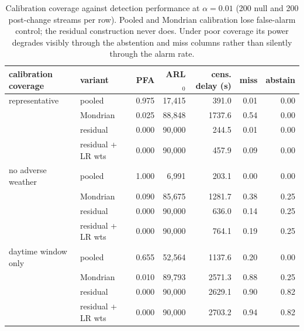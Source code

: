 \begin{table}[t]
\centering
\caption{Calibration coverage against detection performance at $\alpha=0.01$ (200 null and 200 post-change streams per row). Pooled and Mondrian calibration lose false-alarm control; the residual construction never does. Under poor coverage its power degrades visibly through the abstention and miss columns rather than silently through the alarm rate.}
\label{tab:coverage}
\begin{tabular}{llrrrrr}
\toprule
calibration coverage & variant & PFA & ARL$_0$ & cens. delay (s) & miss & abstain \\
\midrule
representative & pooled & 0.975 & 17,415 & 391.0 & 0.01 & 0.00 \\
 & Mondrian & 0.025 & 88,848 & 1737.6 & 0.54 & 0.00 \\
 & residual & 0.000 & 90,000 & 244.5 & 0.01 & 0.00 \\
 & residual + LR wts & 0.000 & 90,000 & 457.9 & 0.09 & 0.00 \\
no adverse weather & pooled & 1.000 & 6,991 & 203.1 & 0.00 & 0.00 \\
 & Mondrian & 0.090 & 85,675 & 1281.7 & 0.38 & 0.25 \\
 & residual & 0.000 & 90,000 & 636.0 & 0.14 & 0.25 \\
 & residual + LR wts & 0.000 & 90,000 & 764.1 & 0.19 & 0.25 \\
daytime window only & pooled & 0.655 & 52,564 & 1137.6 & 0.20 & 0.00 \\
 & Mondrian & 0.010 & 89,793 & 2571.3 & 0.88 & 0.25 \\
 & residual & 0.000 & 90,000 & 2629.1 & 0.90 & 0.82 \\
 & residual + LR wts & 0.000 & 90,000 & 2703.2 & 0.94 & 0.82 \\
\bottomrule
\end{tabular}
\end{table}
